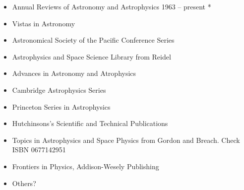 \begin{itemize}
  \item Annual Reviews of Astronomy and Astrophysics 1963 -- present *
  \item Vistas in Astronomy
  \item Astronomical Society of the Pacific Conference Series
  \item Astrophysics and Space Science Library from Reidel
  \item Advances in Astronomy and Atrophysics
  \item Cambridge Astrophysics Series
  \item Princeton Series in Astrophysics
  \item Hutchinsons's Scientific and Technical Publications
  \item Topics in Astrophysics and Space Physics from Gordon and Breach. Check ISBN 0677142951
  \item Frontiers in Physics, Addison-Wesely Publishing    
  \item Others?
\end{itemize}

